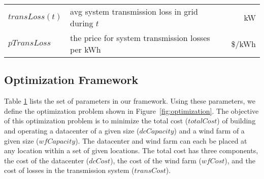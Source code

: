 \begin{table}[ht]
\begin{center}
\begin{tabular}{|l|p{1.9in}|r|}
\hline \hline
$transLoss(t)$  & avg system transmission loss in grid during $t$ & kW \\
$pTransLoss$ & the price for system transmission losses per kWh & \$/kWh \\
\hline
\end{tabular}
\label{tab:par_setting}
\end{center}
\end{table}

\subsection{Optimization Framework}

Table \ref{tab:par_setting} lists the set of parameters in our framework.  Using these parameters, we define the optimization problem shown in Figure~\ref{fig:optimization}.  The objective of this optimization problem is to minimize the total cost ($totalCost$) of building and operating a datacenter of a given size ($dcCapacity$) and a wind farm of a given size ($wfCapacity$). %
The datacenter and wind farm can each be placed at any location within a set of given locations.  The total cost has three components, the cost of the datacenter ($dcCost$), the cost of the wind farm ($wfCost$), and the cost of losses in the transmission system ($transCost$).

